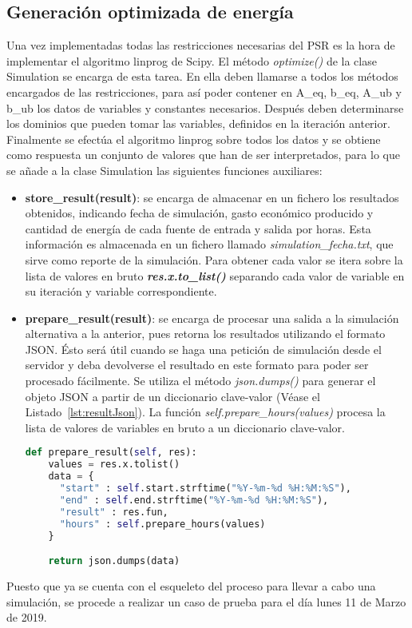 \subsection{Generación optimizada de energía}
Una vez implementadas todas las restricciones necesarias del PSR es la hora de implementar el algoritmo linprog de Scipy. El método \textit{optimize()} de la clase Simulation se encarga de esta tarea. En ella deben llamarse a todos los métodos encargados de las restricciones, para así poder contener en A\_eq, b\_eq, A\_ub y b\_ub los datos de variables y constantes necesarios. Después deben determinarse los dominios que pueden tomar las variables, definidos en la iteración anterior. Finalmente se efectúa el algoritmo linprog sobre todos los datos y se obtiene como respuesta un conjunto de valores que han de ser interpretados, para lo que se añade a la clase Simulation las siguientes funciones auxiliares:
\begin{itemize}
\item \textbf{store\_result(result)}: se encarga de almacenar en un fichero los resultados obtenidos, indicando fecha de simulación, gasto económico producido y cantidad de energía de cada fuente de entrada y salida por horas. Esta información es almacenada en un fichero llamado \textit{simulation\_fecha.txt}, que sirve como reporte de la simulación. Para obtener cada valor se itera sobre la lista de valores en bruto \textbf{\textit{res.x.to\_list()}} separando cada valor de variable en su iteración y variable correspondiente.
\item \textbf{prepare\_result(result)}: se encarga de procesar una salida a la simulación alternativa a la anterior, pues retorna los resultados utilizando el formato \gls{JSON}. Ésto será útil cuando se haga una petición de simulación desde el servidor y deba devolverse el resultado en este formato para poder ser procesado fácilmente. Se utiliza el método \textit{json.dumps()} para generar el objeto \gls{JSON} a partir de un diccionario clave-valor (Véase el Listado~\ref{lst:resultJson}). La función \textit{self.prepare\_hours(values)} procesa la lista de valores de variables en bruto a un diccionario clave-valor.
\begin{lstlisting}[language=Python,float=ht,caption={Función de procesamiento del resultado a formato json},label={lst:resultJson}]
def prepare_result(self, res):
    values = res.x.tolist()
    data = {
      "start" : self.start.strftime("%Y-%m-%d %H:%M:%S"),
      "end" : self.end.strftime("%Y-%m-%d %H:%M:%S"),
      "result" : res.fun,
      "hours" : self.prepare_hours(values)
    }

    return json.dumps(data)
\end{lstlisting}
\end{itemize}
Puesto que ya se cuenta con el esqueleto del proceso para llevar a cabo una simulación, se procede a realizar un caso de prueba para el día lunes 11 de Marzo de 2019.
